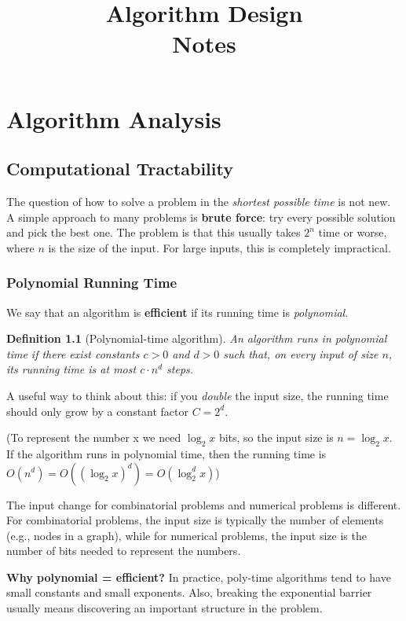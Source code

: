 \documentclass[12pt,a4paper]{report}
\title{\textbf{Algorithm Design} \\ \large Notes}
\author{}
\date{}
\newtheorem{definition}{Definition}
\begin{document}
\maketitle
\tableofcontents

\chapter{Algorithm Analysis}
\section{Computational Tractability}

The question of how to solve a problem in the \emph{shortest possible time} is not new.
A simple approach to many problems is \textbf{brute force}: try every possible solution and
pick the best one. The problem is that this usually takes \(2^n\) time or worse, where
\(n\) is the size of the input. For large inputs, this is completely impractical.

\subsection{Polynomial Running Time}

We say that an algorithm is \textbf{efficient} if its running time is \emph{polynomial}.
\newline
\begin{definition}[Polynomial-time algorithm]
An algorithm runs in polynomial time if there exist constants $c > 0$ and $d > 0$ such
that, on every input of size $n$, its running time is at most $c \cdot n^d$ steps.
\end{definition}

A useful way to think about this: if you \emph{double} the input size, the running time
should only grow by a constant factor $C = 2^d$.

(To represent the number x we need $\log_2 x$ bits, so the input size is $n = \log_2 x$. If the algorithm runs in polynomial time, then the running time is $O(n^d) = O((\log_2 x)^d) = O(\log_2^d x)$)

The input change for combinatorial problems and numerical problems is different. For combinatorial problems, the input size is typically the number of elements (e.g., nodes in a graph), while for numerical problems, the input size is the number of bits needed to represent the numbers.

\textbf{Why polynomial = efficient?} In practice, poly-time algorithms tend to have small
constants and small exponents. Also, breaking the exponential barrier usually means
discovering an important structure in the problem.
\end{document}
